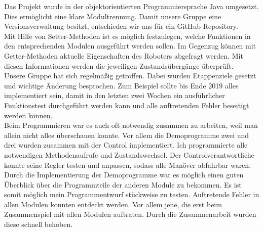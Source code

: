 Das Projekt wurde in der objektorientierten Programmiersprache Java umgesetzt. Dies ermöglicht eine klare Modultrennung. Damit unsere Gruppe eine Versionsverwaltung besitzt, entschieden wir uns für ein \glqq GitHub Repository\grqq{}.\\


\noindent Mit Hilfe von Setter-Methoden ist es möglich festzulegen, welche Funktionen in den entsprechenden Modulen ausgeführt werden sollen.
Im Gegenzug können mit Getter-Methoden aktuelle Eigenschaften des Roboters abgefragt werden. Mit diesen Informationen werden die jeweiligen Zustandsübergänge überprüft.\\

\noindent Unsere Gruppe hat sich regelmäßig getroffen. Dabei wurden Etappenziele gesetzt und wichtige Änderung besprochen. Zum Beispiel sollte bis Ende 2019 alles implementiert sein, damit in den letzten zwei Wochen ein ausführlicher Funktionstest durchgeführt werden kann und alle auftretenden Fehler beseitigt werden können.\\

\noindent Beim Programmieren war es auch oft notwendig zusammen zu arbeiten, weil man allein nicht alles überschauen konnte. Vor allem die Demoprogramme zwei und drei wurden zusammen mit der Control implementiert. Ich programmierte alle notwendigen Methodenaufrufe und Zustandswechsel. Der Controlverantwortliche konnte seine Regler testen und anpassen, sodass alle Manöver abfahrbar waren.\\

\noindent Durch die Implementierung der Demoprogramme war es möglich einen guten Überblick über die Programmteile der anderen Module zu bekommen. Es ist somit möglich mein Programmentwurf stückweise zu testen. Auftretende Fehler in allen Modulen konnten entdeckt werden. Vor allem jene, die erst beim Zusammenspiel mit allen Modulen auftraten. Durch die Zusammenarbeit wurden diese schnell behoben. 